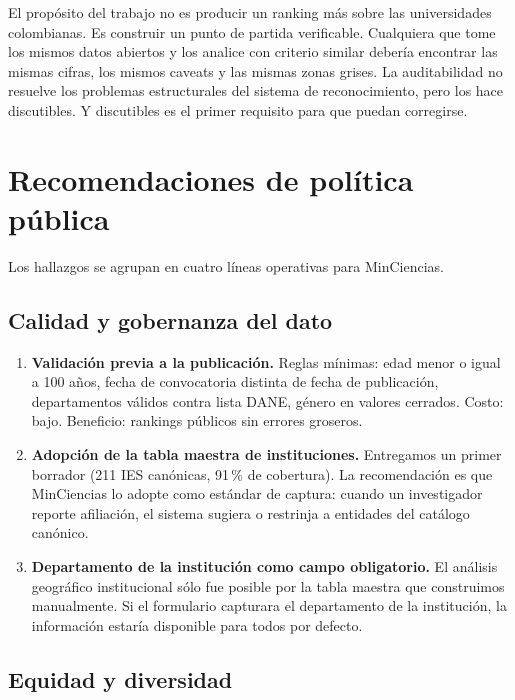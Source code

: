 \documentclass[11pt,a4paper,oneside]{article}
\begin{document}
El propósito del trabajo no es producir un ranking más sobre las universidades colombianas. Es construir un punto de partida verificable. Cualquiera que tome los mismos datos abiertos y los analice con criterio similar debería encontrar las mismas cifras, los mismos caveats y las mismas zonas grises. La auditabilidad no resuelve los problemas estructurales del sistema de reconocimiento, pero los hace discutibles. Y discutibles es el primer requisito para que puedan corregirse.

\section{Recomendaciones de política pública}\label{sec:recomendaciones}

Los hallazgos se agrupan en cuatro líneas operativas para MinCiencias.

\subsection{Calidad y gobernanza del dato}

\begin{enumerate}[label=A.\arabic*., leftmargin=*]
\item \textbf{Validación previa a la publicación.} Reglas mínimas: edad menor o igual a 100 años, fecha de convocatoria distinta de fecha de publicación, departamentos válidos contra lista DANE, género en valores cerrados. Costo: bajo. Beneficio: rankings públicos sin errores groseros.
\item \textbf{Adopción de la tabla maestra de instituciones.} Entregamos un primer borrador (211 IES canónicas, 91\,\% de cobertura). La recomendación es que MinCiencias lo adopte como estándar de captura: cuando un investigador reporte afiliación, el sistema sugiera o restrinja a entidades del catálogo canónico.
\item \textbf{Departamento de la institución como campo obligatorio.} El análisis geográfico institucional sólo fue posible por la tabla maestra que construimos manualmente. Si el formulario capturara el departamento de la institución, la información estaría disponible para todos por defecto.
\end{enumerate}

\subsection{Equidad y diversidad}
\end{document}
